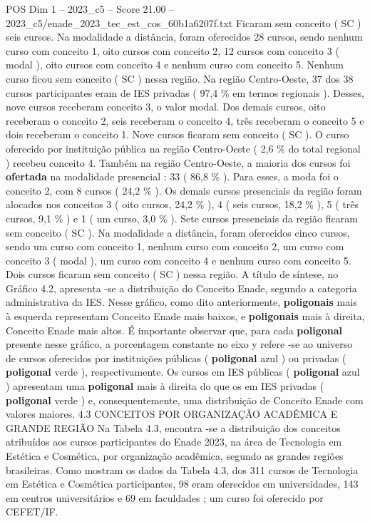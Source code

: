 \begin{textsample}{POS Dim 1 – 2023\_c5 – Score 21.00 – 2023\_c5/enade\_2023\_tec\_est\_cos\_60b1a6207f.txt}
Ficaram sem conceito ( SC ) seis cursos.
Na modalidade a distância, foram oferecidos 28 cursos, sendo nenhum curso com conceito 1, oito cursos com conceito 2, 12 cursos com conceito 3 ( modal ), oito cursos com conceito 4 e nenhum curso com conceito 5.
Nenhum curso ficou sem conceito ( SC ) nessa região.
Na região Centro-Oeste, 37 dos 38 cursos participantes eram de IES privadas ( 97,4 \% em termos regionais ).
Desses, nove cursos receberam conceito 3, o valor modal.
Dos demais cursos, oito receberam o conceito 2, seis receberam o conceito 4, três receberam o conceito 5 e dois receberam o conceito 1.
Nove cursos ficaram sem conceito ( SC ).
O curso oferecido por instituição pública na região Centro-Oeste ( 2,6 \% do total regional ) recebeu conceito 4.
Também na região Centro-Oeste, a maioria dos cursos foi \textbf{ofertada} na modalidade presencial : 33 ( 86,8 \% ).
Para esses, a moda foi o conceito 2, com 8 cursos ( 24,2 \% ).
Os demais cursos presenciais da região foram alocados nos conceitos 3 ( oito cursos, 24,2 \% ), 4 ( seis cursos, 18,2 \% ), 5 ( três cursos, 9,1 \% ) e 1 ( um curso, 3,0 \% ).
Sete cursos presenciais da região ficaram sem conceito ( SC ).
Na modalidade a distância, foram oferecidos cinco cursos, sendo um curso com conceito 1, nenhum curso com conceito 2, um curso com conceito 3 ( modal ), um curso com conceito 4 e nenhum curso com conceito 5.
Dois cursos ficaram sem conceito ( SC ) nessa região.
A título de síntese, no Gráfico 4.2, apresenta -se a distribuição do Conceito Enade, segundo a categoria administrativa da IES.
Nesse gráfico, como dito anteriormente, \textbf{poligonais} mais à esquerda representam Conceito Enade mais baixos, e \textbf{poligonais} mais à direita, Conceito Enade mais altos.
É importante observar que, para cada \textbf{poligonal} presente nesse gráfico, a porcentagem constante no eixo y refere -se ao universo de cursos oferecidos por instituições públicas ( \textbf{poligonal} azul ) ou privadas ( \textbf{poligonal} verde ), respectivamente.
Os cursos em IES públicas ( \textbf{poligonal} azul ) apresentam uma \textbf{poligonal} mais à direita do que os em IES privadas ( \textbf{poligonal} verde ) e, consequentemente, uma distribuição de Conceito Enade com valores maiores. 4.3 CONCEITOS POR ORGANIZAÇÃO ACADÊMICA E GRANDE REGIÃO Na Tabela 4.3, encontra -se a distribuição dos conceitos atribuídos aos cursos participantes do Enade 2023, na área de Tecnologia em Estética e Cosmética, por organização acadêmica, segundo as grandes regiões brasileiras.
Como mostram os dados da Tabela 4.3, dos 311 cursos de Tecnologia em Estética e Cosmética participantes, 98 eram oferecidos em universidades, 143 em centros universitários e 69 em faculdades ; um curso foi oferecido por CEFET/IF.

\end{textsample}
